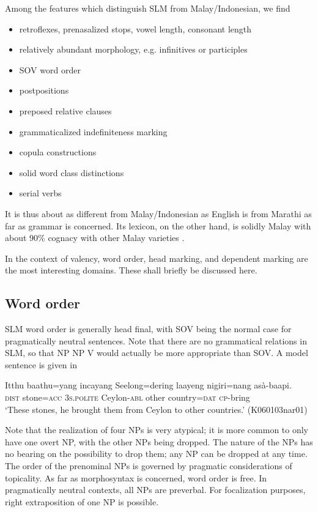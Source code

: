 \documentclass[a4paper,10pt]{article}
\begin{document}
Among the features which distinguish SLM from Malay/Indonesian, we find 
\begin{itemize}
 \item retroflexes, prenasalized stops, vowel length, consonant length
 \item relatively abundant morphology, e.g. infinitives or participles
 \item SOV word order
 \item postpositions
 \item preposed relative clauses
 \item grammaticalized indefiniteness marking
 \item copula constructions  \citep{Nordhoff2011copula}
 \item solid word class distinctions \citep{Nordhofffcjoat}
 \item serial verbs \citep{Nordhofffcsvc}
\end{itemize}

It is thus about as different from Malay/Indonesian as English is from Marathi as far as grammar is concerned. Its lexicon, on the other hand, is solidly Malay with about 90\% cognacy with other Malay varieties \citep{Paauw2004}.

In the context of valency, word order, head marking, and dependent marking are the most interesting domains. These shall briefly be discussed here.


\subsection{Word order}
SLM word order is generally head final, with SOV being the normal case for pragmatically neutral sentences. Note that there are no grammatical relations in SLM, so that NP NP V would actually be more appropriate than SOV. A model sentence is given in 

\ea \label{ex:intro:sov}
\gll Itthu    baathu=yang    incayang Seelong=dering laayeng nigiri=nang asà-baapi. \\
 \textsc{dist} stone=\textsc{acc} \textsc{3s.polite} Ceylon-\textsc{abl} other country=\textsc{dat} \textsc{cp}-bring\\
`These stones, he brought them from Ceylon to other countries.' (K060103nar01)
\z   

Note that the realization of four NPs is very atypical; it is more common to only have one overt NP, with the other NPs being dropped. The nature of the NPs has no bearing on the possibility to drop them; any NP can be dropped at any time. The order of the prenominal NPs is governed by pragmatic considerations of topicality. As far as morphosyntax is concerned, word order is free. In pragmatically neutral contexts, all NPs are preverbal. For focalization purposes, right extraposition of one NP is possible. 
\end{document}
